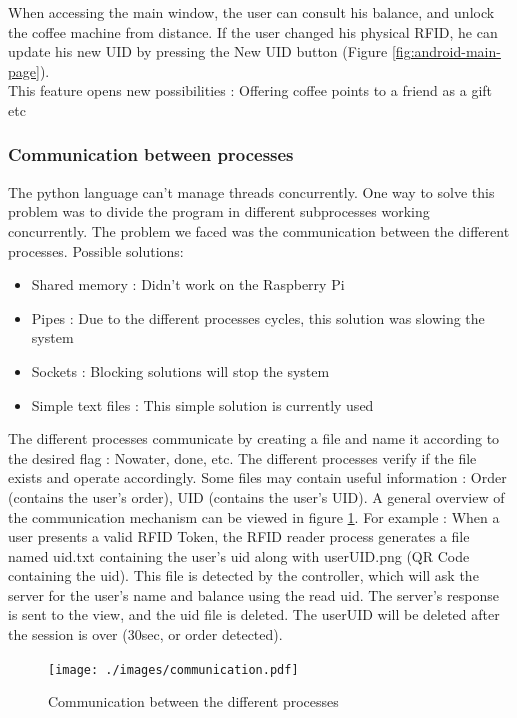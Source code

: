 \documentclass[12pt]{article}
\begin{document}
   When accessing the main window, the user can consult his balance, and unlock the coffee machine from distance. 
   If the user changed his physical RFID, he can update his new UID by pressing the New UID button (Figure \ref{fig:android-main-page}).\\
   This feature opens new possibilities : Offering coffee points to a friend as a gift etc
  
  \subsubsection{Communication between processes}
  
  The python language can't manage threads concurrently. One way to solve this problem was to divide the program in different subprocesses working concurrently.
  The problem we faced was the communication between the different processes. Possible solutions:
  \begin{itemize}
   \item Shared memory : Didn't work on the Raspberry Pi
   \item Pipes : Due to the different processes cycles, this solution was slowing the system
   \item Sockets : Blocking solutions will stop the system
   \item Simple text files : This simple solution is currently used
  \end{itemize}
  
  The different processes communicate by creating a file and name it according to the desired flag : Nowater, done, etc. 
  The different processes verify if the file exists and operate accordingly. 
  Some files may contain useful information : Order (contains the user's order), UID (contains the user's UID).
  A general overview of the communication mechanism can be viewed in figure \ref{fig:communication}.
  For example : When a user presents a valid RFID Token, the RFID reader process generates a file named uid.txt containing the user's uid along with userUID.png (QR Code containing the uid).
  This file is detected by the controller, which will ask the server for the user's name and balance using the read uid. The server's response is sent to the view, and the uid file is deleted.
  The userUID will be deleted after the session is over (30sec, or order detected).
  \begin{figure}[H]
   \centering
   \texttt{[image: ./images/communication.pdf]}
   \captionsetup{justification=centering}
   \caption{Communication between the different processes}
   \label{fig:communication}
  \end{figure}
  
\end{document}
